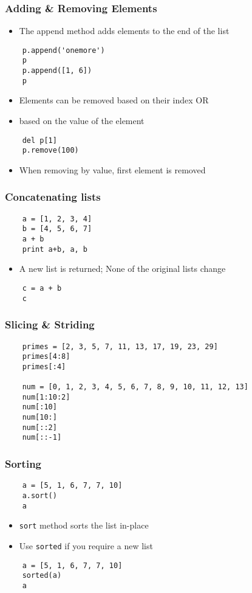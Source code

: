 \begin{frame}[fragile]
  \frametitle{Adding \& Removing Elements}
  \begin{itemize}
  \item The append method adds elements to the end of the list
  \end{itemize}
  \begin{lstlisting}
    p.append('onemore')
    p
    p.append([1, 6])
    p
  \end{lstlisting}
  \begin{itemize}
  \item Elements can be removed based on their index OR
  \item based on the value of the element
  \end{itemize}
  \begin{lstlisting}
    del p[1]
    p.remove(100)
  \end{lstlisting}
  \begin{itemize}
  \item \alert{When removing by value, first element is removed}
  \end{itemize}
\end{frame}


\begin{frame}[fragile]
  \frametitle{Concatenating lists}
  \begin{lstlisting}
    a = [1, 2, 3, 4]
    b = [4, 5, 6, 7]
    a + b
    print a+b, a, b
  \end{lstlisting}
  \begin{itemize}
  \item A new list is returned; None of the original lists change
  \end{itemize}
  \begin{lstlisting}
    c = a + b
    c
  \end{lstlisting}
\end{frame}

\begin{frame}[fragile]
  \frametitle{Slicing \& Striding}
  \begin{lstlisting}
    primes = [2, 3, 5, 7, 11, 13, 17, 19, 23, 29]
    primes[4:8]
    primes[:4]

    num = [0, 1, 2, 3, 4, 5, 6, 7, 8, 9, 10, 11, 12, 13]
    num[1:10:2]
    num[:10]
    num[10:]
    num[::2]
    num[::-1]
  \end{lstlisting}
\end{frame}

\begin{frame}[fragile]
  \frametitle{Sorting}
  \begin{lstlisting}
    a = [5, 1, 6, 7, 7, 10]
    a.sort()
    a
  \end{lstlisting}
  \begin{itemize}
  \item \texttt{sort} method sorts the list in-place
  \item Use \texttt{sorted} if you require a new list
  \end{itemize}
  \begin{lstlisting}
    a = [5, 1, 6, 7, 7, 10]
    sorted(a)
    a
  \end{lstlisting}
\end{frame}

